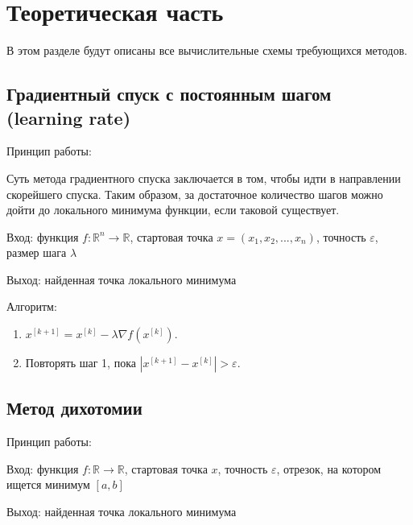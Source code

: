 \chapter{Теоретическая часть}
\label{ch:chap1}

    В этом разделе будут описаны все вычислительные схемы требующихся методов.

\section{Градиентный спуск с постоянным шагом (learning rate)}

    Принцип работы: 

    Суть метода градиентного спуска заключается в том, чтобы идти в направлении скорейшего спуска. Таким образом, за достаточное количество шагов можно дойти до локального минимума функции, если таковой существует.
    

    Вход: функция $f:\mathbb{R}^n \rightarrow \mathbb{R}$, стартовая точка $x = (x_1,x_2,...,x_n)$, точность $\varepsilon$, размер шага $\lambda$
    
    Выход: найденная точка локального минимума

    Алгоритм:
    \begin{enumerate}
        \item $x^{[k+1]} = x^{[k]} - \lambda\nabla f(x^{[k]})$.
        \item Повторять шаг 1, пока  $|x^{[k+1]} - x^{[k]}| > \varepsilon$.
    \end{enumerate}

    
    
\section{Метод дихотомии}

    Принцип работы:
    

    Вход: функция $f:\mathbb{R} \rightarrow \mathbb{R}$, стартовая точка $x$, точность $\varepsilon$, отрезок, на котором ищется минимум $[a ,b]$
    
    Выход: найденная точка локального минимума


